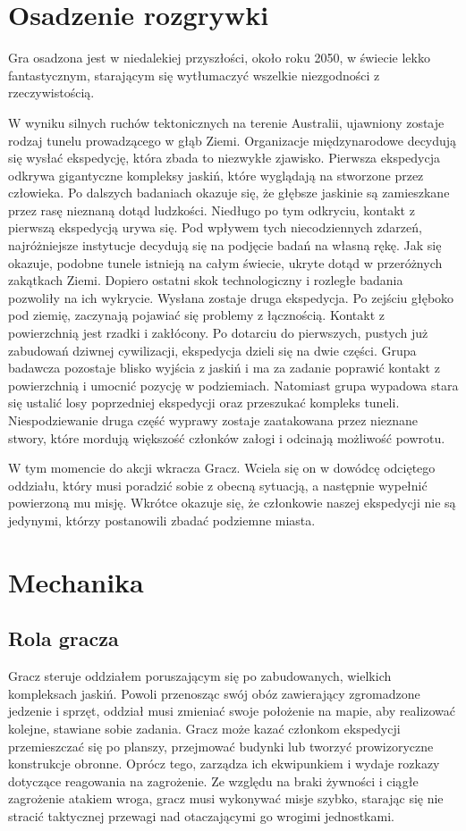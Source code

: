 \documentclass[licencjacka]{pracamgr}
\begin{document}
  \section{Osadzenie rozgrywki}
    Gra osadzona jest w niedalekiej przyszłości, około roku 2050, w świecie lekko fantastycznym, starającym się wytłumaczyć
    wszelkie niezgodności z rzeczywistością. 

    W wyniku silnych ruchów tektonicznych na terenie Australii, ujawniony zostaje rodzaj tunelu
    prowadzącego w głąb Ziemi. Organizacje międzynarodowe decydują się wysłać ekspedycję, która zbada to niezwykłe
    zjawisko. Pierwsza ekspedycja odkrywa gigantyczne kompleksy jaskiń, które wyglądają na stworzone przez człowieka.
    Po dalszych badaniach okazuje się, że głębsze jaskinie są zamieszkane przez rasę nieznaną dotąd ludzkości. Niedługo
    po tym odkryciu, kontakt z pierwszą ekspedycją urywa się. Pod wpływem tych niecodziennych zdarzeń, najróżniejsze
    instytucje decydują się na podjęcie badań na własną rękę. Jak się okazuje, podobne tunele istnieją na całym świecie,
    ukryte dotąd w przeróżnych zakątkach Ziemi. Dopiero ostatni skok technologiczny i rozległe badania pozwoliły na ich 
    wykrycie. Wysłana zostaje druga ekspedycja. Po zejściu głęboko pod ziemię, zaczynają pojawiać się problemy z łącznością.
    Kontakt z powierzchnią jest rzadki i zakłócony. Po dotarciu do pierwszych, pustych już zabudowań dziwnej cywilizacji,
    ekspedycja dzieli się na dwie części. Grupa badawcza pozostaje blisko wyjścia z jaskiń i ma za zadanie poprawić
    kontakt z powierzchnią i umocnić pozycję w podziemiach. Natomiast grupa wypadowa stara się ustalić losy poprzedniej
    ekspedycji oraz przeszukać kompleks tuneli. Niespodziewanie druga część wyprawy zostaje zaatakowana przez nieznane stwory,
    które mordują większość członków załogi i odcinają możliwość powrotu.

    W tym momencie do akcji wkracza Gracz. Wciela się on w dowódcę odciętego oddziału, który musi poradzić sobie z obecną
    sytuacją, a następnie wypełnić powierzoną mu misję. Wkrótce okazuje się, że członkowie naszej ekspedycji nie są jedynymi,
    którzy postanowili zbadać podziemne miasta.

  \section{Mechanika}
    \subsection{Rola gracza}
      Gracz steruje oddziałem poruszającym się po zabudowanych, wielkich kompleksach jaskiń. Powoli przenosząc swój obóz zawierający
      zgromadzone jedzenie i sprzęt, oddział musi zmieniać swoje położenie na mapie, aby realizować kolejne, stawiane sobie zadania.
      Gracz może kazać członkom ekspedycji przemieszczać się po planszy, przejmować budynki lub tworzyć prowizoryczne konstrukcje obronne.
      Oprócz tego, zarządza ich ekwipunkiem i wydaje rozkazy dotyczące reagowania na zagrożenie. Ze względu na braki żywności
      i ciągłe zagrożenie atakiem wroga, gracz musi wykonywać misje szybko, starając się nie stracić taktycznej przewagi nad
      otaczającymi go wrogimi jednostkami.
\end{document}
